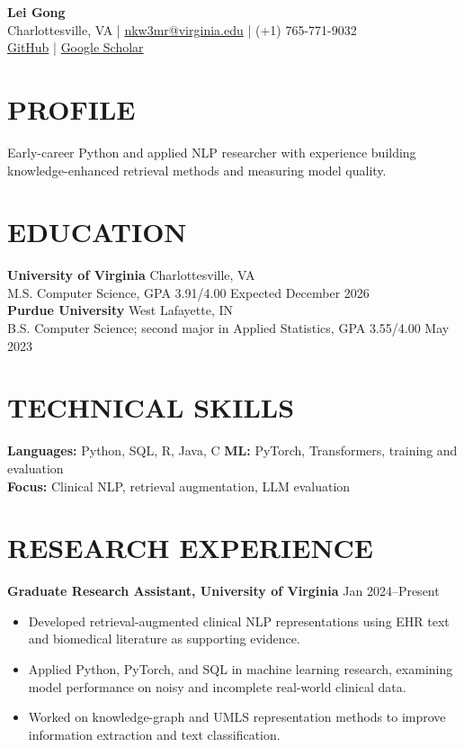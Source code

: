 \documentclass[10pt, letterpaper]{article}
\begin{document}
\setlength{\parindent}{0pt}
\begin{center}
{\fontsize{23}{25}\selectfont\textbf{Lei Gong}}\\[3pt]
Charlottesville, VA \quad | \quad \href{mailto:nkw3mr@virginia.edu}{nkw3mr@virginia.edu} \quad | \quad (+1) 765-771-9032\\[2pt]
\href{https://github.com/LeiGong0125Carrot}{GitHub} \quad | \quad \href{https://scholar.google.com/citations?user=8QLAkKMAAAAJ}{Google Scholar}
\end{center}
\vspace{-3mm}
\section{PROFILE}
Early-career Python and applied NLP researcher with experience building knowledge-enhanced retrieval methods and measuring model quality.
\section{EDUCATION}
\textbf{University of Virginia} \hfill Charlottesville, VA \\
M.S. Computer Science, GPA 3.91/4.00 \hfill Expected December 2026\\[1pt]
\textbf{Purdue University} \hfill West Lafayette, IN \\
B.S. Computer Science; second major in Applied Statistics, GPA 3.55/4.00 \hfill May 2023
\section{TECHNICAL SKILLS}
\textbf{Languages:} Python, SQL, R, Java, C \quad \textbf{ML:} PyTorch, Transformers, training and evaluation\\
\textbf{Focus:} Clinical NLP, retrieval augmentation, LLM evaluation
\section{RESEARCH EXPERIENCE}
\textbf{Graduate Research Assistant, University of Virginia} \hfill Jan 2024--Present
\begin{itemize}
\item Developed retrieval-augmented clinical NLP representations using EHR text and biomedical literature as supporting evidence.
\item Applied Python, PyTorch, and SQL in machine learning research, examining model performance on noisy and incomplete real-world clinical data.
\item Worked on knowledge-graph and UMLS representation methods to improve information extraction and text classification.
\end{itemize}
\end{document}
